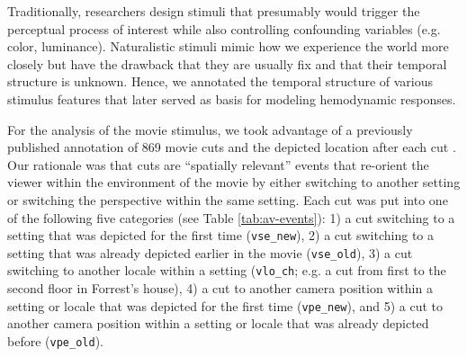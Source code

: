 \documentclass[english]{article}
\begin{document}
Traditionally, researchers design stimuli that presumably would trigger the
perceptual process of interest while also controlling confounding variables
(e.g. color, luminance).
Naturalistic stimuli mimic how we experience the world more closely but have the
drawback that they are usually fix and that their temporal structure is unknown.
Hence, we annotated the temporal structure of various stimulus features that
later served as basis for modeling hemodynamic responses.

For the analysis of the movie stimulus, we took advantage of a previously published
annotation of 869 movie cuts and the depicted location after each cut
\citep{haeusler2016cutanno}.
Our rationale was that cuts are ``spatially relevant'' events that re-orient the
viewer within the environment of the movie by either switching to another
setting or switching the perspective within the same setting.
Each cut was put into one of the following five categories (see Table
\ref{tab:av-events}):
%
1) a cut switching to a setting that was depicted for the first time
(\texttt{vse\_new}),
%
2) a cut switching to a setting that was already depicted earlier in the movie
(\texttt{vse\_old}),
%
3) a cut switching to another locale within a setting (\texttt{vlo\_ch}; e.g. a
cut from first to the second floor in Forrest's house),
%
4) a cut to another camera position within a setting or locale that was depicted
for the first time (\texttt{vpe\_new}), and
%
5) a cut to another camera position within a setting or locale that was already
depicted before (\texttt{vpe\_old}).
\end{document}

